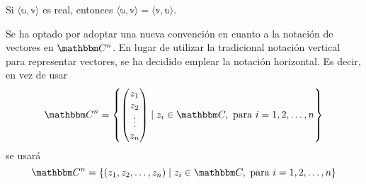 \begin{observation}
    Si $\langle \mathbb{u}, \mathbb{v} \rangle$ es real, entonces $\langle \mathbb{u}, \mathbb{v} \rangle = \langle \mathbb{v}, \mathbb{u} \rangle$.
\end{observation}

\begin{observation}
    Se ha optado por adoptar una nueva convención en cuanto a la notación de vectores en $\CC[n]$. En lugar de utilizar la tradicional notación vertical para representar vectores, se ha decidido emplear la notación horizontal. Es decir, en vez de usar
    $$\CC[n] = \left\{ \begin{pmatrix} z_1 \\ z_2 \\ \vdots \\ z_n \end{pmatrix} \mid z_i \in \CC, \text{ para } i = 1, 2, \dots, n \right\}$$
    se usará
    $$\CC[n] = \left\{ (z_1, z_2, \dots, z_n) \mid z_i \in \CC, \text{ para } i = 1, 2, \dots, n \right\}$$
\end{observation}

